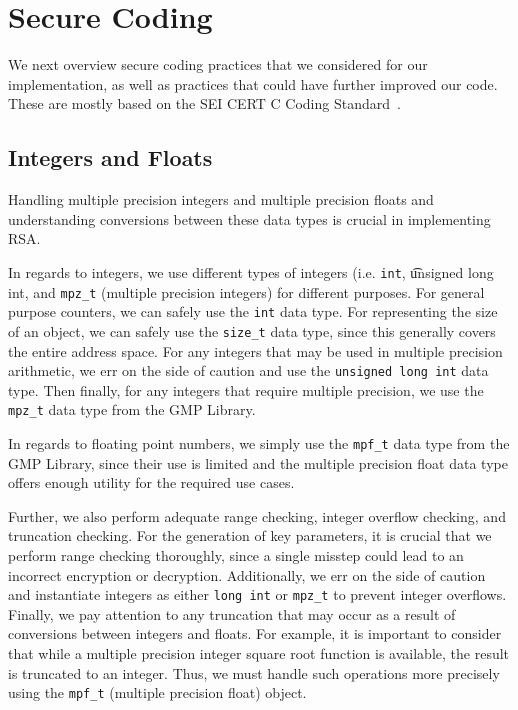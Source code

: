 \documentclass[a4paper]{article}
\begin{document}
\section{Secure Coding}

We next overview secure coding practices that we considered for our implementation, as well as practices that could have further improved our code. These are mostly based on the SEI CERT C Coding Standard~\cite{seacord2008cert}.

\subsection{Integers and Floats}

Handling multiple precision integers and multiple precision floats and understanding conversions between these data types is crucial in implementing RSA.

In regards to integers, we use different types of integers (i.e. {\tt int}, {\t unsigned long int}, and {\tt mpz\_t} (multiple precision integers) for different purposes. For general purpose counters, we can safely use the {\tt int} data type. For representing the size of an object, we can safely use the {\tt size\_t} data type, since this generally covers the entire address space. For any integers that may be used in multiple precision arithmetic, we err on the side of caution
and use the {\tt unsigned long int} data type. Then finally, for any integers that require multiple precision, we use the {\tt mpz\_t} data type from the GMP Library.

In regards to floating point numbers, we simply use the {\tt mpf\_t} data type from the GMP Library, since their use is limited and the multiple precision float data type offers enough utility for the required use cases.

Further, we also perform adequate range checking, integer overflow checking, and truncation checking. For the generation of key parameters, it is crucial that we perform range checking thoroughly, since a
single misstep could lead to an incorrect encryption or decryption. Additionally, we err on the side of caution and instantiate integers as either {\tt long int} or {\tt mpz\_t} to prevent integer overflows. Finally, we pay attention to any truncation that may occur as a result of conversions between integers and floats. For example, it is important to consider that while a multiple precision integer square root function is available, the result is
truncated to an integer. Thus, we must handle such operations more precisely using the {\tt mpf\_t} (multiple precision float) object.
\end{document}
